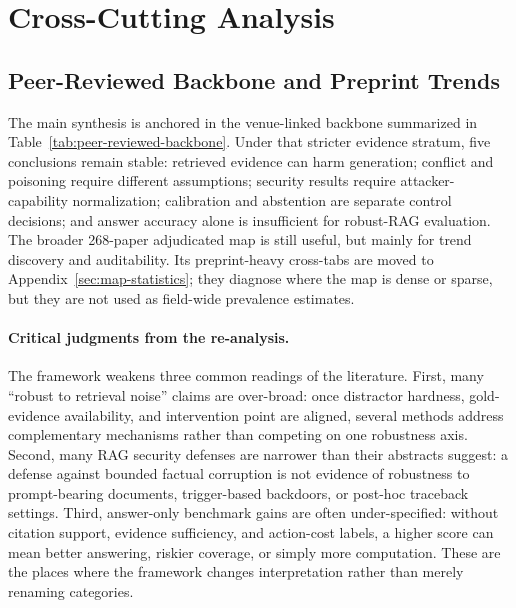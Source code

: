 \documentclass[11pt]{article}
\begin{document}
\section{Cross-Cutting Analysis}
\label{sec:crosscutting}








\subsection{Peer-Reviewed Backbone and Preprint Trends}

The main synthesis is anchored in the venue-linked backbone summarized in Table~\ref{tab:peer-reviewed-backbone}. Under that stricter evidence stratum, five conclusions remain stable: retrieved evidence can harm generation; conflict and poisoning require different assumptions; security results require attacker-capability normalization; calibration and abstention are separate control decisions; and answer accuracy alone is insufficient for robust-RAG evaluation. The broader 268-paper adjudicated map is still useful, but mainly for trend discovery and auditability. Its preprint-heavy cross-tabs are moved to Appendix~\ref{sec:map-statistics}; they diagnose where the map is dense or sparse, but they are not used as field-wide prevalence estimates.

\paragraph{Critical judgments from the re-analysis.}
The framework weakens three common readings of the literature. First, many ``robust to retrieval noise'' claims are over-broad: once distractor hardness, gold-evidence availability, and intervention point are aligned, several methods address complementary mechanisms rather than competing on one robustness axis. Second, many RAG security defenses are narrower than their abstracts suggest: a defense against bounded factual corruption is not evidence of robustness to prompt-bearing documents, trigger-based backdoors, or post-hoc traceback settings. Third, answer-only benchmark gains are often under-specified: without citation support, evidence sufficiency, and action-cost labels, a higher score can mean better answering, riskier coverage, or simply more computation. These are the places where the framework changes interpretation rather than merely renaming categories.
\end{document}
